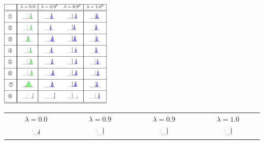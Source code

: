 \documentclass[10pt,twoside,lineno]{article}
\begin{document}
\begin{table}[hbt!]

	\begin{center}
\includegraphics[width=0.4\textwidth]{si-table-perrel-3-1.png}  
\end{center}

	\begin{center}
\begin{tabular}{cccc}
$\lambda=0.0$ & $\lambda=0.9$ & $\lambda=0.9$ & $\lambda=1.0$ \\
	\includegraphics[width=0.15\textwidth]{../results/correlations/figures/posterior-satisfied-universals-parseability.pdf}&
	\includegraphics[width=0.15\textwidth]{../results/correlations/figures/posterior-satisfied-universals-together-large-prior-efficiency09.pdf}&
	\includegraphics[width=0.15\textwidth]{../results/correlations/figures/posterior-satisfied-universals-efficiency-large.pdf}&
	\includegraphics[width=0.15\textwidth]{../results/correlations/figures/posterior-satisfied-universals-together-large-prior-efficiency10.pdf}
\end{tabular}

\end{center}
\end{table}
\end{document}
